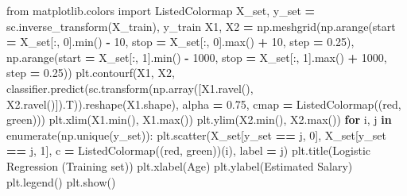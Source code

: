 \documentclass[
]{book}
\newenvironment{Shaded}{\begin{snugshade}}{\end{snugshade}}
\newcommand{\BuiltInTok}[1]{#1}
\newcommand{\ControlFlowTok}[1]{\textcolor[rgb]{0.13,0.29,0.53}{\textbf{#1}}}
\newcommand{\DecValTok}[1]{\textcolor[rgb]{0.00,0.00,0.81}{#1}}
\newcommand{\FloatTok}[1]{\textcolor[rgb]{0.00,0.00,0.81}{#1}}
\newcommand{\ImportTok}[1]{#1}
\newcommand{\KeywordTok}[1]{\textcolor[rgb]{0.13,0.29,0.53}{\textbf{#1}}}
\newcommand{\NormalTok}[1]{#1}
\newcommand{\OperatorTok}[1]{\textcolor[rgb]{0.81,0.36,0.00}{\textbf{#1}}}
\newcommand{\StringTok}[1]{\textcolor[rgb]{0.31,0.60,0.02}{#1}}
\theoremstyle{definition}
\theoremstyle{definition}
\theoremstyle{definition}
\theoremstyle{definition}
\theoremstyle{remark}
\begin{document}
\begin{Shaded}
\begin{Highlighting}[]
\ImportTok{from}\NormalTok{ matplotlib.colors }\ImportTok{import}\NormalTok{ ListedColormap}
\NormalTok{X\_set, y\_set }\OperatorTok{=}\NormalTok{ sc.inverse\_transform(X\_train), y\_train}
\NormalTok{X1, X2 }\OperatorTok{=}\NormalTok{ np.meshgrid(np.arange(start }\OperatorTok{=}\NormalTok{ X\_set[:, }\DecValTok{0}\NormalTok{].}\BuiltInTok{min}\NormalTok{() }\OperatorTok{{-}} \DecValTok{10}\NormalTok{, stop }\OperatorTok{=}\NormalTok{ X\_set[:, }\DecValTok{0}\NormalTok{].}\BuiltInTok{max}\NormalTok{() }\OperatorTok{+} \DecValTok{10}\NormalTok{, step }\OperatorTok{=} \FloatTok{0.25}\NormalTok{),}
\NormalTok{                     np.arange(start }\OperatorTok{=}\NormalTok{ X\_set[:, }\DecValTok{1}\NormalTok{].}\BuiltInTok{min}\NormalTok{() }\OperatorTok{{-}} \DecValTok{1000}\NormalTok{, stop }\OperatorTok{=}\NormalTok{ X\_set[:, }\DecValTok{1}\NormalTok{].}\BuiltInTok{max}\NormalTok{() }\OperatorTok{+} \DecValTok{1000}\NormalTok{, step }\OperatorTok{=} \FloatTok{0.25}\NormalTok{))}
\NormalTok{plt.contourf(X1, X2, classifier.predict(sc.transform(np.array([X1.ravel(), X2.ravel()]).T)).reshape(X1.shape),}
\NormalTok{             alpha }\OperatorTok{=} \FloatTok{0.75}\NormalTok{, cmap }\OperatorTok{=}\NormalTok{ ListedColormap((}\StringTok{\textquotesingle{}red\textquotesingle{}}\NormalTok{, }\StringTok{\textquotesingle{}green\textquotesingle{}}\NormalTok{)))}
\NormalTok{plt.xlim(X1.}\BuiltInTok{min}\NormalTok{(), X1.}\BuiltInTok{max}\NormalTok{())}
\NormalTok{plt.ylim(X2.}\BuiltInTok{min}\NormalTok{(), X2.}\BuiltInTok{max}\NormalTok{())}
\ControlFlowTok{for}\NormalTok{ i, j }\KeywordTok{in} \BuiltInTok{enumerate}\NormalTok{(np.unique(y\_set)):}
\NormalTok{    plt.scatter(X\_set[y\_set }\OperatorTok{==}\NormalTok{ j, }\DecValTok{0}\NormalTok{], X\_set[y\_set }\OperatorTok{==}\NormalTok{ j, }\DecValTok{1}\NormalTok{], c }\OperatorTok{=}\NormalTok{ ListedColormap((}\StringTok{\textquotesingle{}red\textquotesingle{}}\NormalTok{, }\StringTok{\textquotesingle{}green\textquotesingle{}}\NormalTok{))(i), label }\OperatorTok{=}\NormalTok{ j)}
\NormalTok{plt.title(}\StringTok{\textquotesingle{}Logistic Regression (Training set)\textquotesingle{}}\NormalTok{)}
\NormalTok{plt.xlabel(}\StringTok{\textquotesingle{}Age\textquotesingle{}}\NormalTok{)}
\NormalTok{plt.ylabel(}\StringTok{\textquotesingle{}Estimated Salary\textquotesingle{}}\NormalTok{)}
\NormalTok{plt.legend()}
\NormalTok{plt.show()}
\end{Highlighting}
\end{Shaded}
\end{document}
